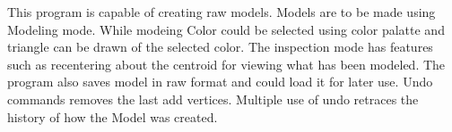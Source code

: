 This program is capable of creating raw models. Models are to be made using Modeling mode. While modeing Color could be selected using color palatte and triangle can be drawn of the selected color. The inspection mode has features such as recentering about the centroid for viewing what has been modeled. The program also saves model in raw format and could load it for later use. Undo commands removes the last add vertices. Multiple use of undo retraces the history of how the Model was created. 